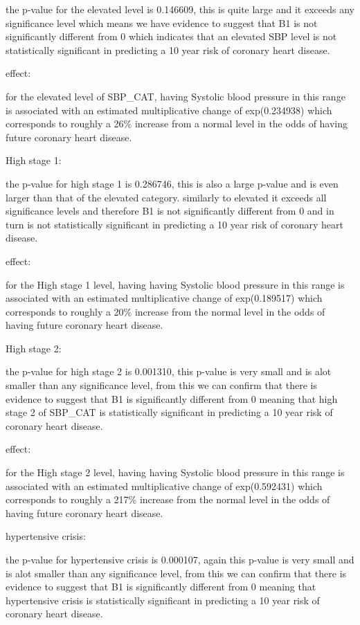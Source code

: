 \documentclass[]{article}
\begin{document}
the p-value for the elevated level is 0.146609, this is quite large and
it exceeds any significance level which means we have evidence to
suggest that B1 is not significantly different from 0 which indicates
that an elevated SBP level is not statistically significant in
predicting a 10 year risk of coronary heart disease.

effect:

for the elevated level of SBP\_CAT, having Systolic blood pressure in
this range is associated with an estimated multiplicative change of
exp(0.234938) which corresponds to roughly a 26\% increase from a normal
level in the odds of having future coronary heart disease.

High stage 1:

the p-value for high stage 1 is 0.286746, this is also a large p-value
and is even larger than that of the elevated category. similarly to
elevated it exceeds all significance levels and therefore B1 is not
significantly different from 0 and in turn is not statistically
significant in predicting a 10 year risk of coronary heart disease.

effect:

for the High stage 1 level, having having Systolic blood pressure in
this range is associated with an estimated multiplicative change of
exp(0.189517) which corresponds to roughly a 20\% increase from the
normal level in the odds of having future coronary heart disease.

High stage 2:

the p-value for high stage 2 is 0.001310, this p-value is very small and
is alot smaller than any significance level, from this we can confirm
that there is evidence to suggest that B1 is significantly different
from 0 meaning that high stage 2 of SBP\_CAT is statistically
significant in predicting a 10 year risk of coronary heart disease.

effect:

for the High stage 2 level, having having Systolic blood pressure in
this range is associated with an estimated multiplicative change of
exp(0.592431) which corresponds to roughly a 217\% increase from the
normal level in the odds of having future coronary heart disease.

hypertensive crisis:

the p-value for hypertensive crisis is 0.000107, again this p-value is
very small and is alot smaller than any significance level, from this we
can confirm that there is evidence to suggest that B1 is significantly
different from 0 meaning that hypertensive crisis is statistically
significant in predicting a 10 year risk of coronary heart disease.
\end{document}
